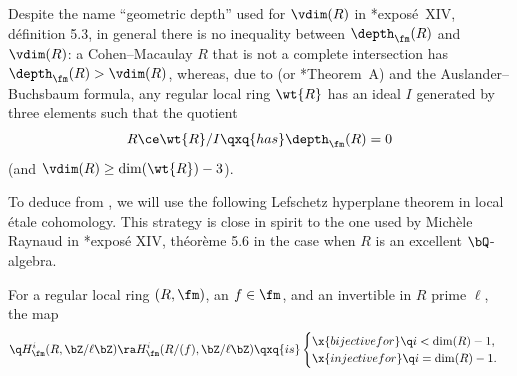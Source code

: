 \brem
Despite the name ``geometric depth'' used for $\vdim(R)$ in \cite{SGA2new}*{expos\'{e}~XIV, d\'{e}finition 5.3}, in general there is no inequality between $\depth_\fm(R)$ and $\vdim(R)$: a Cohen--Macaulay $R$ that is not a complete intersection has $\depth_\fm(R) > \vdim(R) $, whereas, due to \cite{Bur68} (or \cite{Koh72}*{Theorem~A}) and the Auslander--Buchsbaum formula, any regular local ring $\wt{R}$ has an ideal $I$ generated by three elements such that the quotient
\[
R \ce \wt{R}/I \qxq{has} \depth_\fm(R) = 0
\]
(and $\vdim(R) \ge \dim(\wt{R}) - 3$). %
\erem




To deduce  from , we will use the following Lefschetz hyperplane theorem in local \'{e}tale cohomology. This strategy is close in spirit to the one used by Mich\`{e}le Raynaud in \cite{SGA2new}*{expos\'{e} XIV, th\'{e}or\`{e}me 5.6} in the case when $R$ is an excellent $\bQ$-algebra. %







\blem \label{lem:local-hyperplane}
For a regular local ring $(R, \fm)$, an $f \in \fm$, and an invertible in $R$ prime $\ell$, the map
\[
\q H^i_\fm(R, \bZ/\ell\bZ) \ra H^i_\fm(R/(f), \bZ/\ell\bZ) \qxq{is} \begin{cases} \x{bijective for} \q i < \dim(R) - 1, \\ \x{injective for} \q i = \dim(R) - 1. \end{cases}
\]
\elem

